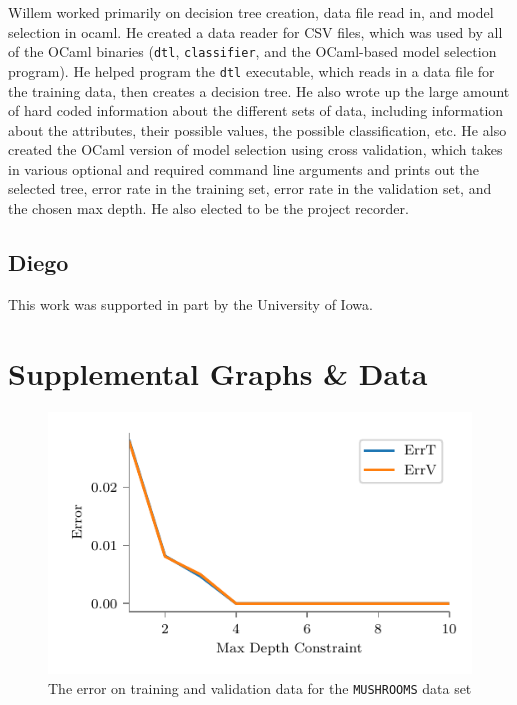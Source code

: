 \documentclass[screen, authorversion, nonacm, sigconf]{acmart}
\begin{document}
Willem worked primarily on decision tree creation, data file read in, and model selection in ocaml. He created a data reader for CSV files, which was used by all of the OCaml binaries (\texttt{dtl}, \texttt{classifier}, and the OCaml-based model selection program). He helped program the \texttt{dtl} executable, which reads in a data file for the training data, then creates a decision tree. He also wrote up the large amount of hard coded information about the different sets of data, including information about the attributes, their possible values, the possible classification, etc. He also created the OCaml version of model selection using cross validation, which takes in various optional and required command line arguments and prints out the selected tree, error rate in the training set, error rate in the validation set, and the chosen max depth. He also elected to be the project recorder.

\subsection{Diego}

\begin{acks}
This work was supported in part by the University of Iowa.
\end{acks}




\appendix

\section{Supplemental Graphs \& Data}

\begin{figure}
  \centering
  \includegraphics[width=\columnwidth]{figures/chart_errt_errv_mushrooms_ours.pdf}
  \caption{The error on training and validation data for the \texttt{MUSHROOMS} data set}
  \label{fig:mushroomserrterrv}
\end{figure}
\end{document}
